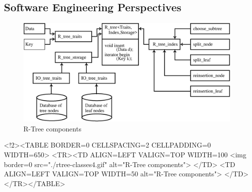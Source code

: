 \subsection{Software Engineering Perspectives}

\begin{ccTexOnly}
\begin{figure}
\begin{center}
\includegraphics[width=14cm,clip]{rtree-classes4.eps}
\end{center}
\caption{\label{r-tree-design} R-Tree components}
\end{figure}
\end{ccTexOnly}
\begin{ccHtmlOnly}
    <!2><TABLE BORDER=0 CELLSPACING=2 CELLPADDING=0 WIDTH=650>
        <TR><TD ALIGN=LEFT VALIGN=TOP WIDTH=100%
    <img border=0 src="./rtree-classes4.gif" alt="R-Tree components">
    </TD>
    <TD ALIGN=LEFT VALIGN=TOP WIDTH=50%
alt="R-Tree components">
      </TD></TR></TABLE>
\end{ccHtmlOnly}


